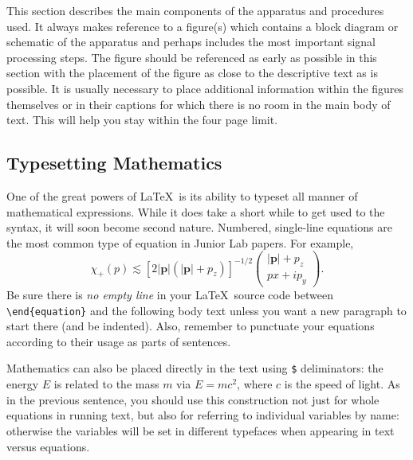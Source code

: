 This section describes the main components of the apparatus and
procedures used. It always makes reference to a figure(s) which
contains a block diagram or schematic of the apparatus and perhaps
includes the most important signal processing steps. The figure
should be referenced as early as possible in this section with the
placement of the figure as close to the descriptive text as is
possible.  It is usually necessary to place additional information
within the figures themselves or in their captions for which there is
no room in the main body of text.  This will help you stay within the
four page limit.


\subsection{Typesetting Mathematics}

One of the great powers of \LaTeX\ is its ability to typeset all
manner of mathematical expressions.  While it does take a short
while to get used to the syntax, it will soon become second nature.
Numbered, single-line equations are the most common type of equation
in Junior Lab papers. For example,
\begin{equation}
   \chi_+(p)\lesssim \left[2 |\bm{p}| (|\bm{p}|+p_z) \right]^{-1/2}
   \left(
   \begin{array}{c}
      |\bm{p}|+p_z\\
      px+ip_y
   \end{array} \right) . \label{eq:first-equation}
\end{equation}
 Be sure there is \emph{no empty line} in your \LaTeX\ source code between
 \verb+\end{equation}+ and the following body text unless you  want 
a new paragraph to start there (and be indented). Also, remember to punctuate 
your equations according to their usage as parts of sentences.

Mathematics can also be placed directly in the text using
\verb+$+ deliminators: the energy $E$ is related to the mass $m$ via $E=mc^2$,
 where $c$ is the speed of light. As in the previous sentence, you should use 
this construction not just for whole equations in running text, but also for 
referring to individual variables by name: otherwise the variables will be set 
in different typefaces when appearing in text versus equations.


